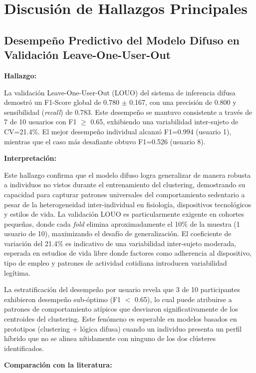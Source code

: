 \section{Discusión de Hallazgos Principales}
\label{sec:discusion_hallazgos}

\subsection{Desempeño Predictivo del Modelo Difuso en Validación Leave-One-User-Out}
\label{subsec:discusion_desempeno_loou}

\textbf{Hallazgo:}

La validación Leave-One-User-Out (LOUO) del sistema de inferencia difusa demostró un F1-Score global de 0.780 $\pm$ 0.167, con una precisión de 0.800 y sensibilidad (\textit{recall}) de 0.783. Este desempeño se mantuvo consistente a través de 7 de 10 usuarios con F1 $\geq$ 0.65, exhibiendo una variabilidad inter-sujeto de CV=21.4\%. El mejor desempeño individual alcanzó F1=0.994 (usuario 1), mientras que el caso más desafiante obtuvo F1=0.526 (usuario 8).

\textbf{Interpretación:}

Este hallazgo confirma que el modelo difuso logra generalizar de manera robusta a individuos no vistos durante el entrenamiento del clustering, demostrando su capacidad para capturar patrones universales del comportamiento sedentario a pesar de la heterogeneidad inter-individual en fisiología, dispositivos tecnológicos y estilos de vida. La validación LOUO es particularmente exigente en cohortes pequeñas, donde cada \textit{fold} elimina aproximadamente el 10\% de la muestra (1 usuario de 10), maximizando el desafío de generalización. El coeficiente de variación del 21.4\% es indicativo de una variabilidad inter-sujeto moderada, esperada en estudios de vida libre donde factores como adherencia al dispositivo, tipo de empleo y patrones de actividad cotidiana introducen variabilidad legítima.

La estratificación del desempeño por usuario revela que 3 de 10 participantes exhibieron desempeño sub-óptimo (F1 $<$ 0.65), lo cual puede atribuirse a patrones de comportamiento atípicos que desviaron significativamente de los centroides del clustering. Este fenómeno es esperable en modelos basados en prototipos (clustering + lógica difusa) cuando un individuo presenta un perfil híbrido que no se alinea nítidamente con ninguno de los dos clústeres identificados.

\textbf{Comparación con la literatura:}

